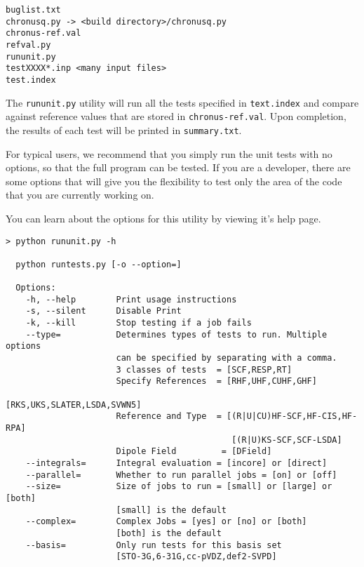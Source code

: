 \documentclass[12pt]{article}
\begin{document}
    \begin{lstlisting}
buglist.txt
chronusq.py -> <build directory>/chronusq.py
chronus-ref.val
refval.py
rununit.py
testXXXX*.inp <many input files>
test.index
    \end{lstlisting}

    \noindent The \texttt{rununit.py} utility will run all the tests specified in \texttt{text.index} 
    and compare against reference values that are stored in \texttt{chronus-ref.val}. Upon 
    completion, the results of each test will be printed in \texttt{summary.txt}. 
    
    For typical users, we recommend that you simply run the unit tests with no options, so that the 
    full program can be tested. If you are a developer, there are some options that will give you the 
    flexibility to test only the area of the code that you are currently working on. 
        
    You can learn about the options for this utility by viewing it's help page. 
    \begin{lstlisting}
> python rununit.py -h

  python runtests.py [-o --option=]

  Options:
    -h, --help        Print usage instructions
    -s, --silent      Disable Print
    -k, --kill        Stop testing if a job fails
    --type=           Determines types of tests to run. Multiple options
                      can be specified by separating with a comma.
                      3 classes of tests  = [SCF,RESP,RT]
                      Specify References  = [RHF,UHF,CUHF,GHF]
                                             [RKS,UKS,SLATER,LSDA,SVWN5]
                      Reference and Type  = [(R|U|CU)HF-SCF,HF-CIS,HF-RPA]
                                             [(R|U)KS-SCF,SCF-LSDA]
                      Dipole Field         = [DField]
    --integrals=      Integral evaluation = [incore] or [direct]
    --parallel=       Whether to run parallel jobs = [on] or [off]
    --size=           Size of jobs to run = [small] or [large] or [both]
                      [small] is the default
    --complex=        Complex Jobs = [yes] or [no] or [both]
                      [both] is the default
    --basis=          Only run tests for this basis set
                      [STO-3G,6-31G,cc-pVDZ,def2-SVPD]
    \end{lstlisting}
   
\end{document}
